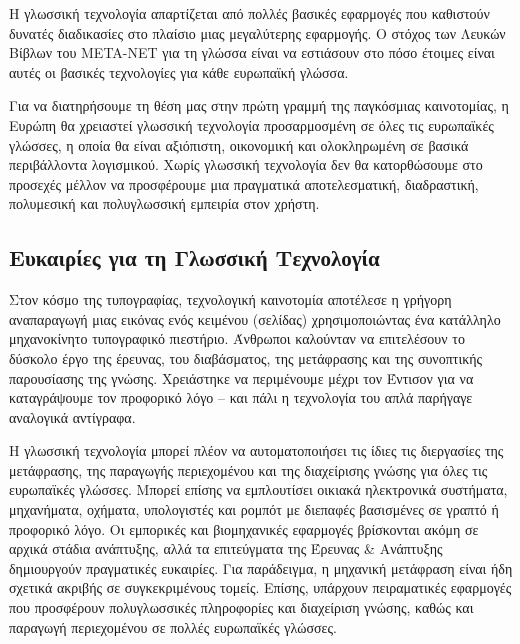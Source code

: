 \begin{multicols}{2}
Η γλωσσική τεχνολογία απαρτίζεται από πολλές βασικές εφαρμογές που καθιστούν δυνατές διαδικασίες στο πλαίσιο μιας μεγαλύτερης εφαρμογής. Ο στόχος των Λευκών Βίβλων του META-NET για τη γλώσσα είναι να εστιάσουν στο πόσο έτοιμες είναι αυτές οι βασικές τεχνολογίες για κάθε ευρωπαϊκή γλώσσα. 


Για να διατηρήσουμε τη θέση μας στην πρώτη γραμμή της παγκόσμιας καινοτομίας, η Ευρώπη θα χρειαστεί γλωσσική τεχνολογία προσαρμοσμένη σε όλες τις ευρωπαϊκές γλώσσες, η οποία θα είναι αξιόπιστη, οικονομική και ολοκληρωμένη σε βασικά περιβάλλοντα λογισμικού. Χωρίς γλωσσική τεχνολογία δεν θα κατορθώσουμε στο προσεχές μέλλον να προσφέρουμε μια πραγματικά αποτελεσματική, διαδραστική, πολυμεσική και πολυγλωσσική εμπειρία στον χρήστη.

\subsection{Ευκαιρίες για τη Γλωσσική Τεχνολογία}

Στον κόσμο της τυπογραφίας, τεχνολογική καινοτομία αποτέλεσε η γρήγορη αναπαραγωγή μιας εικόνας ενός κειμένου (σελίδας) χρησιμοποιώντας ένα κατάλληλο μηχανοκίνητο τυπογραφικό πιεστήριο. Άνθρωποι καλούνταν να επιτελέσουν το δύσκολο έργο της έρευνας, του διαβάσματος, της μετάφρασης και της συνοπτικής παρουσίασης της γνώσης. Χρειάστηκε να περιμένουμε μέχρι τον Έντισον για να καταγράψουμε τον προφορικό λόγο – και πάλι η τεχνολογία του απλά παρήγαγε αναλογικά αντίγραφα.

Η γλωσσική τεχνολογία μπορεί πλέον να αυτοματοποιήσει τις ίδιες τις διεργασίες της μετάφρασης, της παραγωγής περιεχομένου και της διαχείρισης γνώσης για όλες τις ευρωπαϊκές γλώσσες. Μπορεί επίσης να εμπλουτίσει οικιακά ηλεκτρονικά συστήματα, μηχανήματα, οχήματα, υπολογιστές και ρομπότ με διεπαφές βασισμένες σε γραπτό ή προφορικό λόγο. Οι εμπορικές και βιομηχανικές εφαρμογές βρίσκονται ακόμη σε αρχικά στάδια ανάπτυξης, αλλά τα επιτεύγματα της Έρευνας \& Ανάπτυξης δημιουργούν πραγματικές ευκαιρίες. Για παράδειγμα, η μηχανική μετάφραση είναι ήδη σχετικά ακριβής σε συγκεκριμένους τομείς. Επίσης, υπάρχουν πειραματικές εφαρμογές που προσφέρουν πολυγλωσσικές πληροφορίες και διαχείριση γνώσης, καθώς και παραγωγή περιεχομένου σε πολλές ευρωπαϊκές γλώσσες.


\end{multicols}
